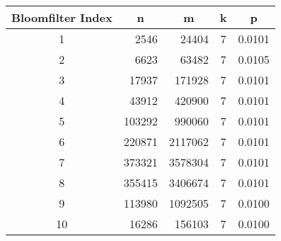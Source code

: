 \renewcommand{\arraystretch}{1.5}
\begin{center}
	\begin{tabular}{|c | r | r | c | c |} 
		\hline
		\textbf{Bloomfilter Index} & \multicolumn{1}{c|}{\textbf{n}} & \multicolumn{1}{c|}{\textbf{m}} & \textbf{k} & \textbf{p} \\ 
		\hline
		1 & 2546 & 24404 & 7 & 0.0101\\ 
		\hline
		2 & 6623 & 63482 & 7 & 0.0105\\
		\hline
		3 & 17937 & 171928 & 7 & 0.0101 \\
		\hline
		4 & 43912 & 420900 & 7 & 0.0101\\
		\hline
		5 & 103292 & 990060 & 7 & 0.0101\\
		\hline
		6 & 220871 & 2117062 & 7 & 0.0101 \\ 
		\hline
		7 & 373321 & 3578304 & 7 & 0.0101\\ 
		\hline
		8 & 355415 & 3406674 & 7 & 0.0101\\ 
		\hline
		9 & 113980 & 1092505 & 7 & 0.0100\\ 
		\hline
		10 & 16286 & 156103 & 7 & 0.0100\\ 
		\hline
	\end{tabular}
\end{center}
